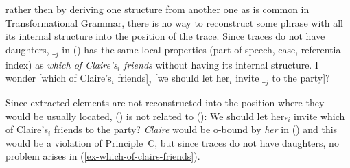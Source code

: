\documentclass[output=paper,biblatex,babelshorthands,newtxmath,draftmode,colorlinks,citecolor=brown]{langscibook}
\begin{document}
rather then by deriving one structure from another one as is common in Transformational Grammar,
there is no way to reconstruct some phrase with all its internal structure into the position of the
trace. Since traces do not have daughters, $\__j$ in () has the same local properties (part
of speech, case, referential index) as \emph{which of Claire's$_i$ friends} without having its
internal structure. 
\ea
\label{ex-which-of-clairs-friends}
I wonder [which of Claire's$_i$ friends]$_j$ [we should let her$_i$ invite $\__j$ to the party]?
\z
{}

Since extracted elements are not reconstructed into the position where they would be usually
located, () is not related to ():
\ea
We should let her$_{*i}$ invite which of Claire's$_i$ friends to the party?
\z
\emph{Claire} would be o-bound by \emph{her} in () and this would be a violation of
Principle~C, but since traces do not have daughters, no problem arises in (\ref{ex-which-of-clairs-friends}). 
\end{document}
